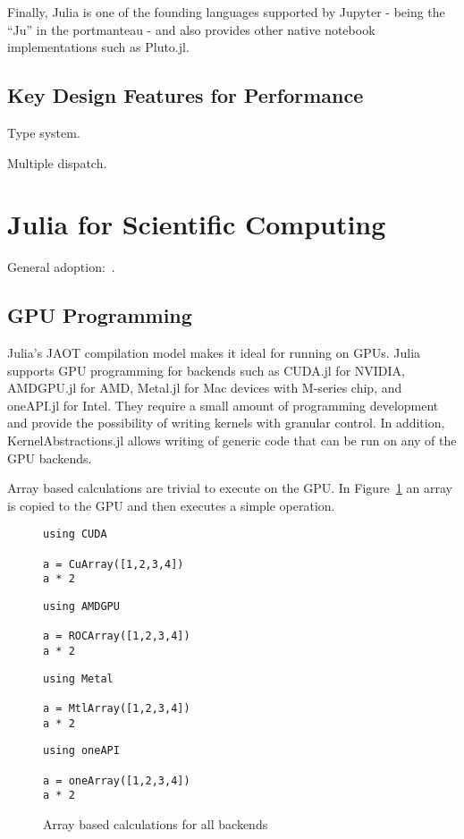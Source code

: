 \documentclass{webofc}
\begin{document}
Finally, Julia is one of the founding languages supported by Jupyter - being the
``Ju'' in the portmanteau - and also provides other native notebook
implementations such as Pluto.jl. 

\subsection{Key Design Features for Performance}

Type system.

Multiple dispatch.

\section{Julia for Scientific Computing}
\label{sec:juliascicomp}

General adoption:~\cite{perkel-julia-science}.
    
\subsection{GPU Programming}

Julia's JAOT compilation model makes it ideal for running on GPUs. Julia supports GPU programming for backends such as CUDA.jl for NVIDIA, AMDGPU.jl for AMD, Metal.jl for Mac devices with M-series chip, and oneAPI.jl for Intel. They require a small amount of programming development and provide the possibility of writing kernels with granular control. In addition, KernelAbstractions.jl allows writing of generic code that can be run on any of the GPU backends.  

Array based calculations are trivial to execute on the GPU. In Figure~\ref{code:arraysgpu} an array is copied to the GPU and then executes a simple operation. 

\begin{figure}[!ht]
\centering
\begin{verbatim}
using CUDA

a = CuArray([1,2,3,4])
a * 2
\end{verbatim}
\begin{verbatim}
using AMDGPU

a = ROCArray([1,2,3,4])
a * 2
\end{verbatim}
\begin{verbatim}
using Metal

a = MtlArray([1,2,3,4])
a * 2
\end{verbatim}
\begin{verbatim}
using oneAPI

a = oneArray([1,2,3,4])
a * 2
\end{verbatim}
\caption{Array based calculations for all backends}
\label{code:arraysgpu}
\end{figure}
\end{document}
